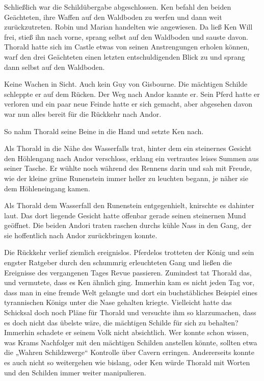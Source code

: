 Schließlich war die Schildübergabe abgeschlossen. Ken befahl den beiden Geächteten, ihre Waffen auf den Waldboden zu werfen und dann weit zurückzutreten. Robin und Marian handelten wie angewiesen. Da ließ Ken Will frei, stieß ihn nach vorne, sprang selbst auf den Waldboden und sauste davon. Thorald hatte sich im Castle etwas von seinen Anstrengungen erholen können, warf den drei Geächteten einen letzten entschuldigenden Blick zu und sprang dann selbst auf den Waldboden.

Keine Wachen in Sicht. Auch kein Guy von Gisbourne. Die mächtigen Schilde schleppte er auf dem Rücken. Der Weg nach Andor kannte er. Sein Pferd hatte er verloren und ein paar neue Feinde hatte er sich gemacht, aber abgesehen davon war nun alles bereit für die Rückkehr nach Andor.

So nahm Thorald seine Beine in die Hand und setzte Ken nach.



\trennzeichen



Als Thorald in die Nähe des Wasserfalls trat, hinter dem ein steinernes Gesicht den Höhlengang nach Andor verschloss, erklang ein vertrautes leises Summen aus seiner Tasche. Er wühlte noch während des Rennens darin und sah mit Freude, wie der kleine grüne Runenstein immer heller zu leuchten begann, je näher sie dem Höhleneingang kamen.

Als Thorald dem Wasserfall den Runenstein entgegenhielt, knirschte es dahinter laut. Das dort liegende Gesicht hatte offenbar gerade seinen steinernen Mund geöffnet. Die beiden Andori traten raschen durchs kühle Nass in den Gang, der sie hoffentlich nach Andor zurückbringen konnte.

\newpage
{}

Die Rückkehr verlief ziemlich ereignislos. Pferdelos trotteten der König und sein engster Ratgeber durch den schummrig erleuchteten Gang und ließen die Ereignisse des vergangenen Tages Revue passieren. Zumindest tat Thorald das, und vermutete, dass es Ken ähnlich ging. Immerhin kam es nicht jeden Tag vor, dass man in eine fremde Welt gelangte und dort ein buchstäbliches Beispiel eines tyrannischen Königs unter die Nase gehalten kriegte. Vielleicht hatte das Schicksal doch noch Pläne für Thorald und versuchte ihm so klarzumachen, dass es doch nicht das übelste wäre, die mächtigen Schilde für sich zu behalten? Immerhin schadete er seinem Volk nicht absichtlich. Wer konnte schon wissen, was Krams Nachfolger mit den mächtigen Schilden anstellen könnte, sollten etwa die „Wahren Schildzwerge“ Kontrolle über Cavern erringen. Andererseits konnte es auch nicht so weitergehen wie bislang, oder Ken würde Thorald mit Worten und den Schilden immer weiter manipulieren.

